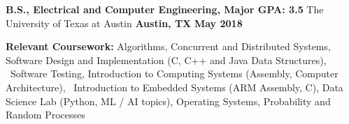 \begin{cventries}
  \cventry
    {\textbf{\normalsize B.S., Electrical and Computer Engineering, Major GPA: \large 3.5}}
    {\large The University of Texas at Austin}
    {\normalsize \textbf{Austin, TX}}
    {\normalsize \textbf{May 2018}}
    {
      \begin{cvitems}
      \item {\normalsize \textbf{Relevant Coursework:} Algorithms, Concurrent and Distributed Systems, Software Design and Implementation (C, C++ and Java Data Structures), \ Software Testing, Introduction to Computing Systems (Assembly, Computer Architecture), \ Introduction to Embedded Systems (ARM Assembly, C), Data Science Lab (Python, ML / AI topics), Operating Systems, Probability and Random Processes}
      \end{cvitems}
    }
\end{cventries}
